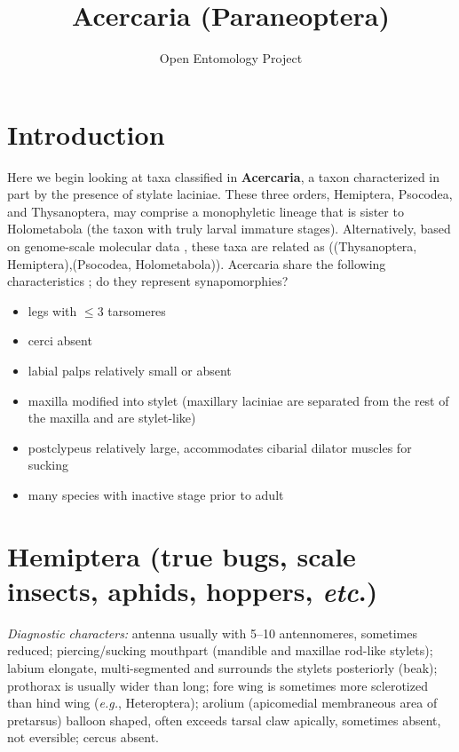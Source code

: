\documentclass[letterpaper, 11pt]{article}
\title{Acercaria (Paraneoptera)}
\author{Open Entomology Project}
\begin{document}
\cleanlookdateon %
\maketitle
\thispagestyle{fancy}
\section*{Introduction}
Here we begin looking at taxa classified in \textbf{Acercaria}, a taxon characterized in part by the presence of stylate laciniae. These three orders, Hemiptera, Psocodea, and Thysanoptera, may comprise a monophyletic lineage that is sister to Holometabola (the taxon with truly larval immature stages). Alternatively, based on genome-scale molecular data \citep{Misof763}, these taxa are related as ((Thysanoptera, Hemiptera),(Psocodea, Holometabola)). Acercaria share the following characteristics \citep{beutel2013insect}; do they represent synapomorphies?

\begin{itemize}
\item legs with $\le$3 tarsomeres
\item cerci absent 
\item labial palps relatively small or absent 
\item maxilla modified into stylet (maxillary laciniae are separated from the rest of the maxilla and are stylet-like)
\item postclypeus relatively large, accommodates cibarial dilator muscles for sucking
\item many species with inactive stage prior to adult
\end{itemize}

\section{Hemiptera (true bugs, scale insects, aphids, hoppers, \textit{etc}.)}
\noindent{}\textit{Diagnostic characters:} antenna usually with 5--10 antennomeres, sometimes reduced; piercing/sucking mouthpart (mandible and maxillae rod-like stylets); labium elongate, multi-segmented and surrounds the stylets posteriorly (beak); prothorax is usually wider than long; fore wing is sometimes more sclerotized than hind wing (\textit{e.g.}, Heteroptera); arolium (apicomedial membraneous area of pretarsus) balloon shaped, often exceeds tarsal claw apically, sometimes absent, not eversible; cercus absent.\\
\end{document}
